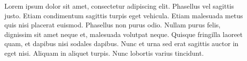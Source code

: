 Lorem ipsum dolor sit amet, consectetur adipiscing elit. Phasellus vel sagittis justo. Etiam condimentum sagittis turpis eget vehicula. Etiam malesuada metus quis nisi placerat euismod.
Phasellus non purus odio. Nullam purus felis, dignissim sit amet neque et, malesuada volutpat neque.
Quisque fringilla laoreet quam, et dapibus nisi sodales dapibus. Nunc et urna sed erat sagittis auctor in eget nisi. Aliquam in aliquet turpis. Nunc lobortis varius tincidunt.